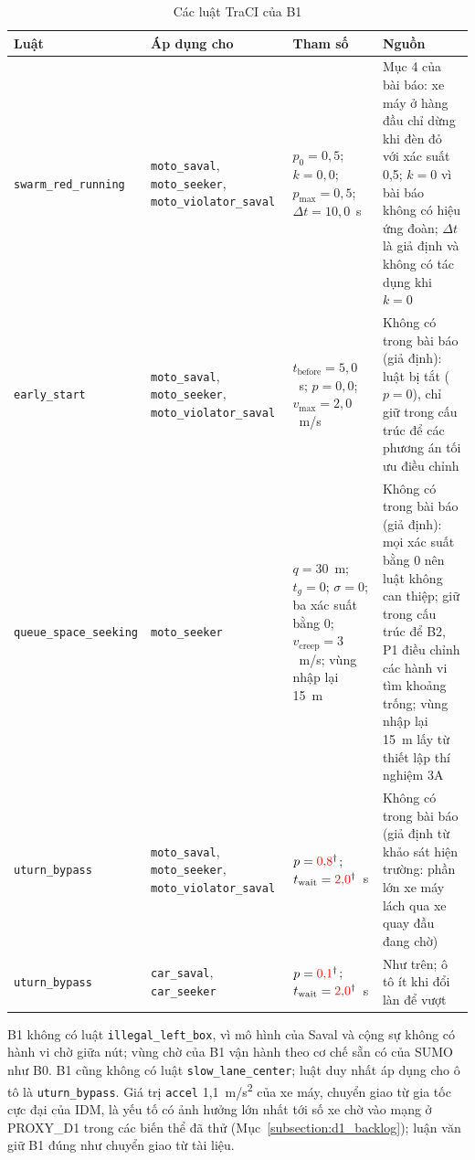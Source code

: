 \documentclass[../main.tex]{subfiles}
\begin{document}
\begin{table}[!htbp]
\centering
\small
\caption{Các luật TraCI của B1}
\label{table:appendix_b1_rules}
\begin{tabular}{|p{3.2cm}|p{3.4cm}|p{3.0cm}|p{3.4cm}|}
\hline
\textbf{Luật} & \textbf{Áp dụng cho} & \textbf{Tham số} & \textbf{Nguồn} \\ \hline
\texttt{swarm\_\allowbreak red\_\allowbreak running} & \texttt{moto\_\allowbreak saval}, \texttt{moto\_\allowbreak seeker}, \texttt{moto\_\allowbreak violator\_\allowbreak saval} & $p_0 = 0{,}5$; $k = 0{,}0$; $p_{\max} = 0{,}5$; $\Delta t = 10{,}0$~s & Mục 4 của bài báo: xe máy ở hàng đầu chỉ dừng khi đèn đỏ với xác suất 0,5; $k = 0$ vì bài báo không có hiệu ứng đoàn; $\Delta t$ là giả định và không có tác dụng khi $k = 0$ \\ \hline
\texttt{early\_\allowbreak start} & \texttt{moto\_\allowbreak saval}, \texttt{moto\_\allowbreak seeker}, \texttt{moto\_\allowbreak violator\_\allowbreak saval} & $t_{\text{before}} = 5{,}0$~s; $p = 0{,}0$; $v_{\max} = 2{,}0$~m/s & Không có trong bài báo (giả định): luật bị tắt ($p = 0$), chỉ giữ trong cấu trúc để các phương án tối ưu điều chỉnh \\ \hline
\texttt{queue\_\allowbreak space\_\allowbreak seeking} & \texttt{moto\_\allowbreak seeker} & $q = 30$~m; $t_{g} = 0$; $\sigma = 0$; ba xác suất bằng 0; $v_{\text{creep}} = 3$~m/s; vùng nhập lại 15~m & Không có trong bài báo (giả định): mọi xác suất bằng 0 nên luật không can thiệp; giữ trong cấu trúc để B2, P1 điều chỉnh các hành vi tìm khoảng trống; vùng nhập lại 15~m lấy từ thiết lập thí nghiệm 3A \\ \hline
\texttt{uturn\_\allowbreak bypass} & \texttt{moto\_\allowbreak saval}, \texttt{moto\_\allowbreak seeker}, \texttt{moto\_\allowbreak violator\_\allowbreak saval} & $p = \textcolor{red}{0{,}8}^{\dagger}$; $t_{\text{wait}} = \textcolor{red}{2{,}0}^{\dagger}$~s & Không có trong bài báo (giả định từ khảo sát hiện trường: phần lớn xe máy lách qua xe quay đầu đang chờ) \\ \hline
\texttt{uturn\_\allowbreak bypass} & \texttt{car\_\allowbreak saval}, \texttt{car\_\allowbreak seeker} & $p = \textcolor{red}{0{,}1}^{\dagger}$; $t_{\text{wait}} = \textcolor{red}{2{,}0}^{\dagger}$~s & Như trên; ô tô ít khi đổi làn để vượt \\ \hline
\end{tabular}
\end{table}

B1 không có luật \texttt{illegal\_\allowbreak left\_\allowbreak box}, vì mô hình của Saval và cộng sự không có hành vi chờ giữa nút; vùng chờ của B1 vận hành theo cơ chế sẵn có của SUMO như B0. B1 cũng không có luật \texttt{slow\_\allowbreak lane\_\allowbreak center}; luật duy nhất áp dụng cho ô tô là \texttt{uturn\_bypass}. Giá trị \texttt{accel} 1,1~m/s\textsuperscript{2} của xe máy, chuyển giao từ gia tốc cực đại của IDM, là yếu tố có ảnh hưởng lớn nhất tới số xe chờ vào mạng ở PROXY\_D1 trong các biến thể đã thử (Mục~\ref{subsection:d1_backlog}); luận văn giữ B1 đúng như chuyển giao từ tài liệu.
\end{document}
